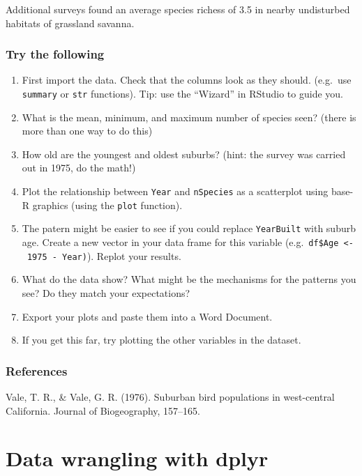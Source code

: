 \documentclass[
  a4paperpaper,
]{book}
\begin{document}
Additional surveys found an average species richess of 3.5 in nearby undisturbed habitats of grassland savanna.

\hypertarget{try-the-following}{%
\subsection{Try the following}\label{try-the-following}}

\begin{enumerate}
\def\labelenumi{\arabic{enumi}.}
\item
  First import the data. Check that the columns look as they should. (e.g.~use \texttt{summary} or \texttt{str} functions). Tip: use the ``Wizard'' in RStudio to guide you.
\item
  What is the mean, minimum, and maximum number of species seen? (there is more than one way to do this)
\item
  How old are the youngest and oldest suburbs? (hint: the survey was carried out in 1975, do the math!)
\item
  Plot the relationship between \texttt{Year} and \texttt{nSpecies} as a scatterplot using base-R graphics (using the \texttt{plot} function).
\item
  The patern might be easier to see if you could replace \texttt{YearBuilt} with suburb age. Create a new vector in your data frame for this variable (e.g.~\texttt{df\$Age\ \textless{}-\ 1975\ -\ Year)}). Replot your results.
\item
  What do the data show? What might be the mechanisms for the patterns you see? Do they match your expectations?
\item
  Export your plots and paste them into a Word Document.
\item
  If you get this far, try plotting the other variables in the dataset.
\end{enumerate}

\hypertarget{references}{%
\subsection{References}\label{references}}

Vale, T. R., \& Vale, G. R. (1976). Suburban bird populations in west-central California. Journal of Biogeography, 157--165.

\hypertarget{data-wrangling-with-dplyr}{%
\chapter{Data wrangling with dplyr}\label{data-wrangling-with-dplyr}}
\end{document}
